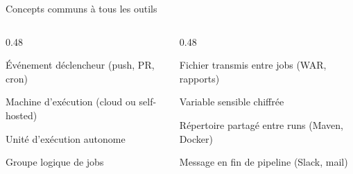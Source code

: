 \documentclass[aspectratio=169,12pt]{beamer}
\begin{document}
\begin{frame}{Concepts communs à tous les outils}
  \begin{columns}
    \begin{column}{0.48\textwidth}
      \begin{description}
        \item[\textbf{Trigger}] Événement déclencheur (push, PR, cron)
        \item[\textbf{Runner}] Machine d'exécution (cloud ou self-hosted)
        \item[\textbf{Job}] Unité d'exécution autonome
        \item[\textbf{Stage}] Groupe logique de jobs
      \end{description}
    \end{column}
    \begin{column}{0.48\textwidth}
      \begin{description}
        \item[\textbf{Artefact}] Fichier transmis entre jobs (WAR, rapports)
        \item[\textbf{Secret}] Variable sensible chiffrée
        \item[\textbf{Cache}] Répertoire partagé entre runs (Maven, Docker)
        \item[\textbf{Notification}] Message en fin de pipeline (Slack, mail)
      \end{description}
    \end{column}
  \end{columns}
\end{frame}
\end{document}
